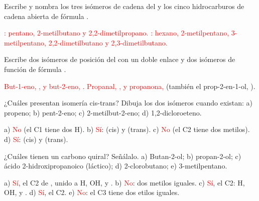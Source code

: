 \begin{exercise}
    Escribe y nombra los tres isómeros de cadena del  y los cinco hidrocarburos de cadena abierta de fórmula .
    \begin{solu}
        \textcolor{red}{: pentano, 2-metilbutano y 2,2-dimetilpropano.} \textcolor{red}{: hexano,
        2-metilpentano, 3-metilpentano, 2,2-dimetilbutano y 2,3-dimetilbutano.}
    \end{solu}
\end{exercise}

\begin{exercise}
    Escribe dos isómeros de posición del  con un doble enlace y dos isómeros de función de fórmula .
    \begin{solu}
        \textcolor{red}{But-1-eno, , y but-2-eno, .} \textcolor{red}{Propanal,
        , y propanona, } (también el prop-2-en-1-ol, ).
    \end{solu}
\end{exercise}

\begin{exercise}
    ¿Cuáles presentan isomería cis-trans? Dibuja los dos isómeros cuando existan: a) propeno; b) pent-2-eno; c)
    2-metilbut-2-eno; d) 1,2-dicloroeteno.
    \begin{solu}
        a) \textcolor{red}{No} (el C1 tiene dos H). b) \textcolor{red}{Sí}:  (cis) y
         (trans). c) \textcolor{red}{No} (el C2 tiene dos metilos). d)
        \textcolor{red}{Sí}:  (cis) y  (trans).
    \end{solu}
\end{exercise}

\begin{exercise}
    ¿Cuáles tienen un carbono quiral? Señálalo. a) Butan-2-ol; b) propan-2-ol; c) ácido 2-hidroxipropanoico (láctico); d)
    2-clorobutano; e) 3-metilpentano.
    \begin{solu}
        a) \textcolor{red}{Sí}, el C2 de , unido a H, OH,  y . b) \textcolor{red}{No}: dos metilos iguales.
        c) \textcolor{red}{Sí}, el C2: H, OH,  y . d) \textcolor{red}{Sí}, el C2. e) \textcolor{red}{No}: el C3
        tiene dos etilos iguales.
    \end{solu}
\end{exercise}

